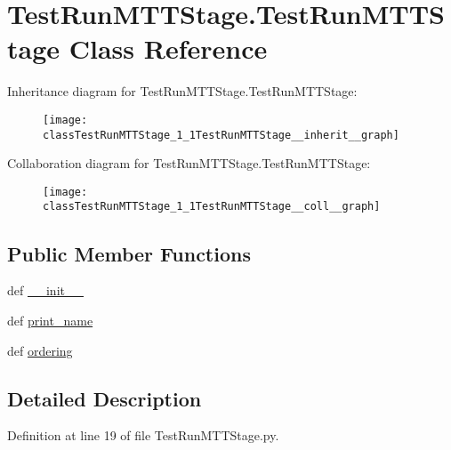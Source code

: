 \hypertarget{classTestRunMTTStage_1_1TestRunMTTStage}{\section{Test\-Run\-M\-T\-T\-Stage.\-Test\-Run\-M\-T\-T\-Stage Class Reference}
\label{classTestRunMTTStage_1_1TestRunMTTStage}
}


Inheritance diagram for Test\-Run\-M\-T\-T\-Stage.\-Test\-Run\-M\-T\-T\-Stage\-:\nopagebreak
\begin{figure}[H]
\begin{center}
\leavevmode
\texttt{[image: classTestRunMTTStage\_1\_1TestRunMTTStage\_\_inherit\_\_graph]}
\end{center}
\end{figure}


Collaboration diagram for Test\-Run\-M\-T\-T\-Stage.\-Test\-Run\-M\-T\-T\-Stage\-:\nopagebreak
\begin{figure}[H]
\begin{center}
\leavevmode
\texttt{[image: classTestRunMTTStage\_1\_1TestRunMTTStage\_\_coll\_\_graph]}
\end{center}
\end{figure}
\subsection*{Public Member Functions}
\begin{DoxyCompactItemize}
\item 
def \hyperlink{classTestRunMTTStage_1_1TestRunMTTStage_a832d01c482e3593c6ca5a70a8c50401b}{\-\_\-\-\_\-init\-\_\-\-\_\-}
\item 
def \hyperlink{classTestRunMTTStage_1_1TestRunMTTStage_ae33f5d11e9f6d745e5a4b8b527581787}{print\-\_\-name}
\item 
def \hyperlink{classTestRunMTTStage_1_1TestRunMTTStage_ab22af0d8f9b65095162240a35a072068}{ordering}
\end{DoxyCompactItemize}


\subsection{Detailed Description}


Definition at line 19 of file Test\-Run\-M\-T\-T\-Stage.\-py.



